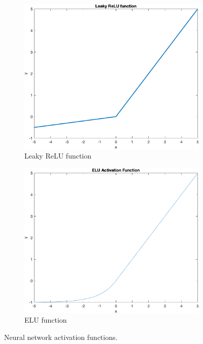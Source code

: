 \begin{figure}
    \begin{subfigure}[b]{0.4\textwidth}
        \includegraphics[width=\textwidth]{figures/leakyrelu}
        \caption{Leaky ReLU function}
        \label{fig:leakyrelu}
    \end{subfigure}
    \hspace{0.1\textwidth}
    \begin{subfigure}[b]{0.4\textwidth}
        \includegraphics[width=\textwidth]{figures/elu}
        \caption{ELU function}
        \label{fig:elu}
    \end{subfigure}
    \caption{Neural network activation functions.}
    \label{fig:activationfunctions}
\end{figure}

